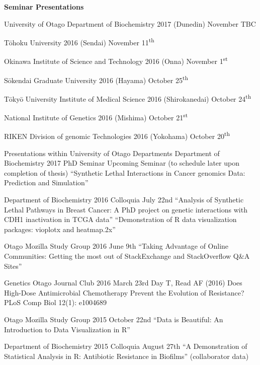 \clearpage
\textbf{Seminar Presentations}

\begin{small}

University of Otago Department of Biochemistry 2017 (Dunedin) November TBC

T\={o}hoku University 2016 (Sendai) November 11\textsuperscript{th}

Okinawa Institute of Science and Technology 2016 (Onna) November 1\textsuperscript{st}

S\={o}kendai Graduate University 2016 (Hayama) October 25\textsuperscript{th}

T\={o}ky\={o} University Institute of Medical Science 2016 (Shirokanedai) October 24\textsuperscript{th} 

National Institute of Genetics 2016 (Mishima) October 21\textsuperscript{st}

RIKEN Division of \Gls{genomic} Technologies 2016 (Yokohama) October 20\textsuperscript{th}

\end{small}




\iffalse
Presentations within University of Otago Departments
Department of Biochemistry 2017 PhD Seminar
Upcoming Seminar (to schedule later upon completion of thesis)
``Synthetic Lethal Interactions in Cancer \Glspl{genomic} Data: Prediction and Simulation''

Department of Biochemistry 2016 Colloquia July 22nd
``Analysis of Synthetic Lethal Pathways in Breast Cancer: A PhD project on genetic interactions with CDH1 inactivation in \gls{TCGA} data''
``Demonstration of R data visualization packages: vioplotx and heatmap.2x''

Otago Mozilla Study Group 2016 June 9th
``Taking Advantage of Online Communities: Getting the most out of StackExchange and StackOverflow Q&A Sites''

Genetics Otago Journal Club 2016 March 23rd 
Day T, Read AF (2016) Does High-Dose Antimicrobial Chemotherapy Prevent the Evolution of Resistance? PLoS Comp Biol 12(1): e1004689

Otago Mozilla Study Group 2015 October 22nd
``Data is Beautiful: An Introduction to Data Visualization in R''

Department of Biochemistry 2015 Colloquia August 27th
``A Demonstration of Statistical Analysis in R: Antibiotic Resistance in Biofilms'' (collaborator data)

